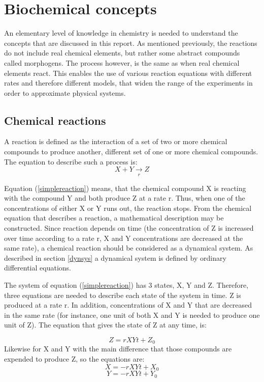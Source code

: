\chapter{Biochemical concepts}
\label{biochemical}
An elementary level of knowledge in chemistry is needed to understand the concepts that are discussed in this report. As mentioned previously, the reactions do not include real chemical elements, but rather some abstract compounds called morphogens. The process however, is the same as when real chemical elements react. This enables the use of various reaction equations with different rates and therefore different models, that widen the range of the experiments in order to approximate physical systems.
\section{Chemical reactions}
A reaction is defined as the interaction of a set of two or more chemical compounds to produce another, different set of one or more chemical compounds. The equation to describe such a process is:
\begin{equation}
\label{simplereaction}
X + Y \underset{r} \to Z
\end{equation}

Equation (\ref{simplereaction}) means, that the chemical compound X is reacting with the compound Y and both produce Z at a rate r. Thus, when one of the concentrations of either X or Y runs out, the reaction stops.
From the chemical equation that describes a reaction, a mathematical description may be constructed. Since reaction depends on time (the concentration of Z is increased over time according to a rate r, X and Y concentrations are decreased at the same rate), a chemical reaction should be considered as a dynamical system. As described in section \ref{dynsys} a dynamical system is defined by ordinary differential equations. 

The system of equation (\ref{simplereaction}) has 3 states, X, Y and Z. Therefore, three equations are needed to describe each state of the system in time. Z is produced at a rate r. In addition, concentrations of X and Y that are decreased in the same rate (for instance, one unit of both X and Y is needed to produce one unit of Z). The equation that gives the state of Z at any time, is: 

\begin{equation}
\label{Zreaction} 
Z = rXYt + Z_0
\end{equation}
Likewise for X and Y with the main difference that those compounds are expended to produce Z, so the equations are:
\begin{equation}
\label{Xreaction}
X = -rXYt + X_0
\end{equation}
\begin{equation}
\label{Yreaction}
Y = -rXYt + Y_0
\end{equation}

